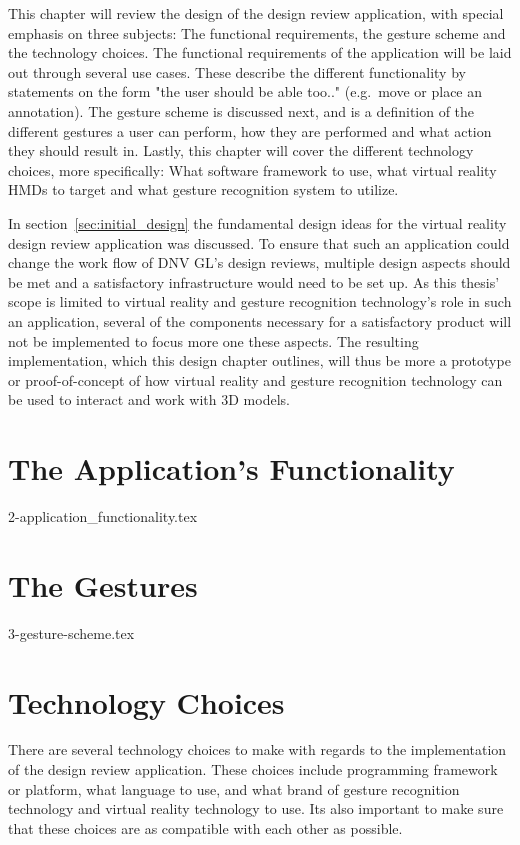 This chapter will review the design of the design review application, with special emphasis on three subjects: The functional requirements, the gesture scheme and the technology choices.
The functional requirements of the application will be laid out through several use cases. These describe the different functionality by statements on the form
"the user should be able too.." (e.g.~move or place an annotation). The gesture scheme is discussed next, and is a definition of the different gestures
a user can perform, how they are performed and what action they should result in. Lastly, this chapter will cover the different technology choices, more specifically: What
software framework to use, what virtual reality HMDs to target and what gesture recognition system to utilize. 

In section~\vref{sec:initial_design} the fundamental design ideas for the virtual reality design review application was discussed. 
To ensure that such an application could change the work flow of DNV GL's design reviews, multiple design aspects should be met and a satisfactory infrastructure would need to be
set up. As this thesis' scope is limited to virtual reality and gesture recognition technology's role in such an application, several of the components necessary for
a satisfactory product will not be implemented to focus more one these aspects. The resulting implementation, which this design chapter outlines, will thus be more
a prototype or proof-of-concept of how virtual reality and gesture recognition technology can be used to interact and work with 3D models. 

\section{The Application's Functionality}
{2-application_functionality.tex}

\section{The Gestures}
\label{sec:gesture_design}
{3-gesture-scheme.tex}

\section{Technology Choices}
\label{sec:design_choices}
There are several technology choices to make with regards to the implementation of the design review application.
These choices include programming framework or platform, what language to use, and what brand of gesture recognition technology and
virtual reality technology to use. Its also important to make sure that these choices are as compatible with each other as possible.

